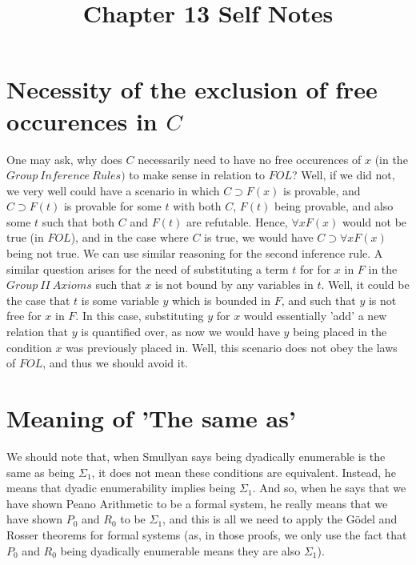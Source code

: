 \documentclass{article}
\title{Chapter 13 Self Notes}
\theoremstyle{definition}
\begin{document}
\maketitle

\section*{Necessity of the exclusion of free occurences in $C$}
One may ask, why does $C$ necessarily need to have no free occurences of $x$ (in the $Group\ Inference\ Rules)$ to make sense in relation to $FOL$?
 Well, if we did not, we very well could have a scenario in which $C\supset F(x)$ is provable, and $C\supset F(t)$ is provable for some $t$ with both 
$C$, $F(t)$ being provable, and also some $t$ such that both $C$ and $F(t)$ are refutable. Hence, $\forall xF(x)$ would not be true (in $FOL$), and 
in the case where $C$ is true, we would have $C\supset \forall xF(x)$ being not true. We can use similar reasoning for the second inference rule.\newline
\newline A similar question arises for the need of substituting a term $t$ for for $x$ in $F$ in the $Group\ II\ Axioms$ such that $x$ is not bound by any 
variables in $t$. Well, it could be the case that 
$t$ is some variable $y$ which is bounded in $F$, and such that $y$ is not free for $x$ in $F$. In this case, substituting $y$ for $x$ would essentially 
'add' a new relation that $y$ is quantified over, as now we would have $y$ being placed in the condition $x$ was previously 
placed in. Well, this scenario does not obey the laws of $FOL$, and thus we should avoid it.

\section*{Meaning of 'The same as'}
We should note that, when Smullyan says being dyadically enumerable is the same as being $\Sigma_1$, it does not mean these conditions are equivalent. 
Instead, he means that dyadic enumerability implies being $\Sigma_1$. And so, when he says that we have shown Peano Arithmetic to be a formal system, 
he really means that we have shown $P_0$ and $R_0$ to be $\Sigma_1$, and this is all we need to apply the Gödel and Rosser theorems for formal 
systems (as, in those proofs, we only use the fact that $P_0$ and $R_0$ being dyadically enumerable means they are also $\Sigma_1$).
\end{document}
